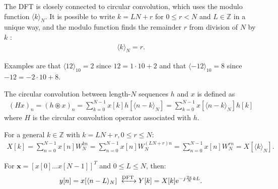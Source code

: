 The DFT is closely connected to circular convolution, which uses the modulo function $\langle k\rangle_N$. It is possible to write $k = LN+r$ for $0 \leq r < N$ and $L \in \mathbb{Z}$ in a unique way, and the modulo function finds the remainder $r$ from division of $N$ by $k$ :
\begin{align*}
\langle k \rangle_N = r.
\end{align*}

Examples are that $\langle 12 \rangle_{10} = 2$ since $12 = 1 \cdot 10 + 2$ and that $\langle -12 \rangle_{10} = 8$ since $-12 = -2 \cdot 10 + 8$.

\begin{definition}
 	The circular convolution between length-$N$ sequences $h$ 		and $x$ is defined as
	\begin{align*}
	(Hx)_n = (h \circledast x)_n = \sum_{k = 0}^{N-1} x[k] 			h[\langle n-k\rangle_N] =\sum_{k = 0}^{N-1} x[\langle n-k		\rangle_N] h[k]
	\end{align*}
	where $H$ is the circular convolution operator associated 		with $h$.
\end{definition}

For a general $k\in\mathbb{Z}$ with $k = LN + r, 0 \leq r \leq N$:
\begin{align*}
X[k] = \sum_{n=0}^{N-1} x[n] W_N^{kn} = \sum_{n=0}^{N-1} x[n] W_N^{(LN+r)n} = \sum_{n=0}^{N-1} x[n] W_N^{rn} = X[\langle k\rangle_N].
\end{align*}

\begin{lemma}
For $\textbf{x} = [x[0] \dots x[N-1]]^T$ and $0 \leq L \leq N$, then:
\begin{align*}
y[n]  = x[\langle n-L\rangle_N] \xleftrightarrow{\text{DFT}} Y[k] = X[k] \text{e}^{-j\frac{2\pi}{N} kL}.
\end{align*}
\end{lemma}


